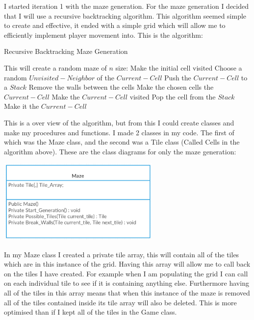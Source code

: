 \documentclass[12pt]{article}
\begin{document}
I started iteration 1 with the maze generation. For the maze generation I decided that I will use a recursive backtracking algorithm. This algorithm seemed simple to create and effective, it ended with a simple grid which will allow me to efficiently implement player movement into. This is the algorithm:

\begin{algorithm}
\caption{Recursive Backtracking Maze Generation}
\begin{algorithmic}

\STATE This will create a random maze of $n$ size:
\STATE Make the initial cell visited
		\STATE Choose a random $Unvisited-Neighbor$ of the $Current-Cell$
		\STATE Push the $Current-Cell$ to a $Stack$
		\STATE Remove the walls between the cells
		\STATE Make the chosen cells the $Current-Cell$
		\STATE Make the $Current-Cell$ visited
	\ELSE
			\STATE Pop the cell from the $Stack$
			\STATE Make it the $Current-Cell$
		\ENDIF
	\ENDIF
\ENDWHILE

\end{algorithmic}
\end{algorithm}

This is a over view of the algorithm, but from this I could create classes and make my procedures and functions. I made 2 classes in my code. The first of which was the Maze class, and the second was a Tile class (Called Cells in the algorithm above). These are the class diagrams for only the maze generation:

\includegraphics[width = 0.6\textwidth]{UML_Maze_Maze-Generation}

In my Maze class I created a private tile array, this will contain all of the tiles which are in this instance of the grid. Having this array will allow me to call back on the tiles I have created. For example when I am populating the grid I can call on each individual tile to see if it is containing anything else. Furthermore having all of the tiles in this array means that when this instance of the maze is removed all of the tiles contained inside its tile array will also be deleted. This is more optimised than if I kept all of the tiles in the Game class.
\end{document}
